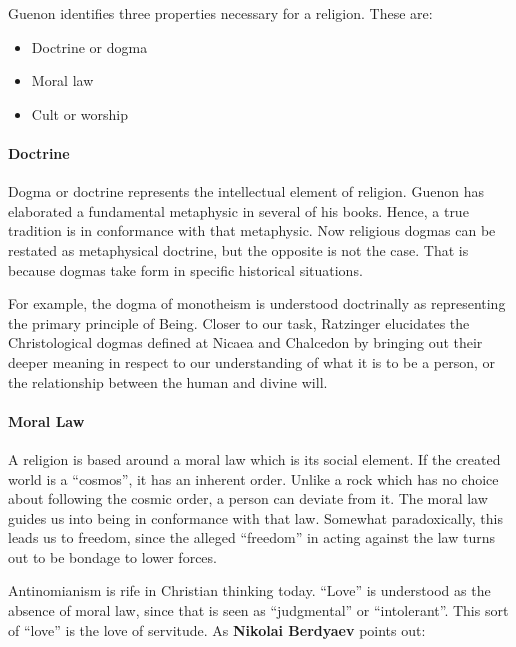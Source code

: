 Guenon identifies three properties necessary for a religion. These are:

\begin{itemize}


\item Doctrine or dogma

\item Moral law

\item Cult or worship
\end{itemize}


\paragraph{Doctrine}


Dogma or doctrine represents the intellectual element of religion. Guenon has elaborated a fundamental metaphysic in several of his books. Hence, a true tradition is in conformance with that metaphysic. Now religious dogmas can be restated as metaphysical doctrine, but the opposite is not the case. That is because dogmas take form in specific historical situations.

For example, the dogma of monotheism is understood doctrinally as representing the primary principle of Being. Closer to our task, Ratzinger elucidates the Christological dogmas defined at Nicaea and Chalcedon by bringing out their deeper meaning in respect to our understanding of what it is to be a person, or the relationship between the human and divine will.

\paragraph{Moral Law}


A religion is based around a moral law which is its social element. If the created world is a ``cosmos'', it has an inherent order. Unlike a rock which has no choice about following the cosmic order, a person can deviate from it. The moral law guides us into being in conformance with that law. Somewhat paradoxically, this leads us to freedom, since the alleged ``freedom'' in acting against the law turns out to be bondage to lower forces.

Antinomianism is rife in Christian thinking today. ``Love'' is understood as the absence of moral law, since that is seen as ``judgmental'' or ``intolerant''. This sort of ``love'' is the love of servitude. As \textbf{Nikolai Berdyaev} points out:

